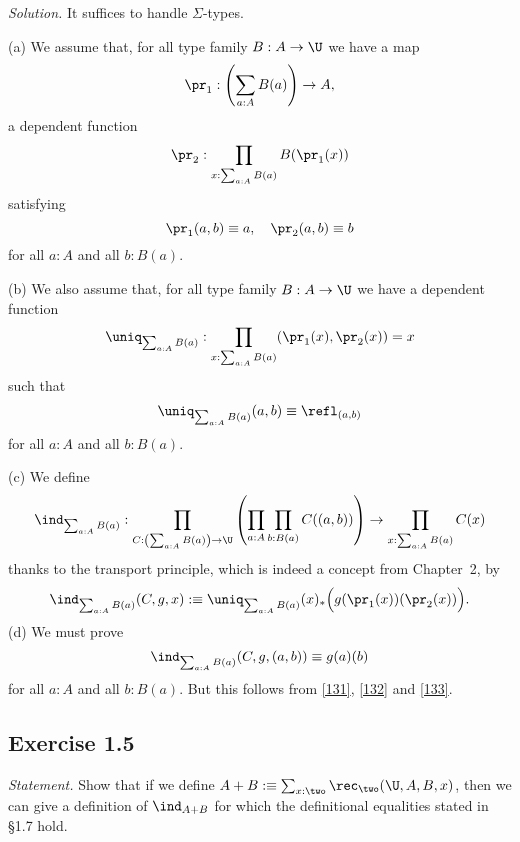 \documentclass[12pt]{article}
\begin{document}
\nn\emph{Solution.} It suffices to handle $\Sigma$-types. 

\nn(a) We assume that, for all type family $B:A\to\U$ we have a map 
$$
\pr_1:\left(\sum_{a:A}B(a)\right)\to A,
$$ 
a dependent function 
$$
\pr_2:\prod_{x:\sum_{a:A}B(a)}B(\pr_1(x))
$$
satisfying
\begin{equation}\label{131}
\pr_1(a,b)\equiv a,\quad\pr_2(a,b)\equiv b
\end{equation}
for all $a:A$ and all $b:B(a)$.

\nn(b) We also assume that, for all type family $B:A\to\U$ we have a dependent function 
$$
\uniq_{\sum_{a:A}B(a)}:\prod_{x:\sum_{a:A}B(a)}(\pr_1(x),\pr_2(x))=x
$$ 
such that 
\begin{equation}\label{132}
\uniq_{\sum_{a:A}B(a)}(a,b)\equiv\refl_{(a,b)}
\end{equation}
for all $a:A$ and all $b:B(a)$. 

\nn(c) We define
$$
\ind_{\sum_{a:A}B(a)}:\prod_{C:\left(\sum_{a:A}B(a)\right)\to\U} 
\left(\prod_{a:A}\prod_{b:B(a)} C((a,b))\right) 
\to\prod_{x:\sum_{a:A}B(a)} C(x)
$$
thanks to the transport principle, which is indeed a concept from Chapter~2, by
\begin{equation}\label{133}
\ind_{\sum_{a:A}B(a)}(C,g,x):
\equiv\uniq_{\sum_{a:A}B(a)}(x)_*\Big(g(\pr_1(x))(\pr_2(x))\Big).
\end{equation}
(d) We must prove 
$$
\ind_{\sum_{a:A}B(a)}(C,g,(a,b))\equiv g(a)(b)
$$
for all $a:A$ and all $b:B(a)$. But this follows from \eqref{131}, \eqref{132} and \eqref{133}.


\subsection{Exercise 1.5}

\emph{Statement.} Show that if we define $A+B:\equiv\sum_{x:\two}\rec_\two(\U,A,B,x)$, then we can give a definition of $\ind_{A+B}$ for which the definitional equalities stated in \S1.7 hold.
\end{document}
